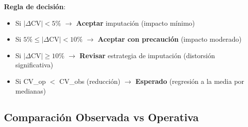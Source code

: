\documentclass[12pt,letterpaper,twoside]{report}
\begin{document}
\begin{reglabox}
\textbf{Regla de decisión}:

\begin{itemize}[noitemsep]
    \item Si $|\Delta\text{CV}| < 5\%$ $\to$ \textbf{Aceptar} imputación (impacto mínimo)
    \item Si $5\% \leq |\Delta\text{CV}| < 10\%$ $\to$ \textbf{Aceptar con precaución} (impacto moderado)
    \item Si $|\Delta\text{CV}| \geq 10\%$ $\to$ \textbf{Revisar} estrategia de imputación (distorsión significativa)
    \item Si CV\_op $<$ CV\_obs (reducción) $\to$ \textbf{Esperado} (regresión a la media por medianas)
\end{itemize}
\end{reglabox}

\subsection{Comparación Observada vs Operativa}

\begin{table}[H]
\centering
\caption{Coeficiente de Variación: Observado vs Operativo (promedio 10 usuarios)}
\label{tab:variability_dual}
\end{table}
\end{document}

